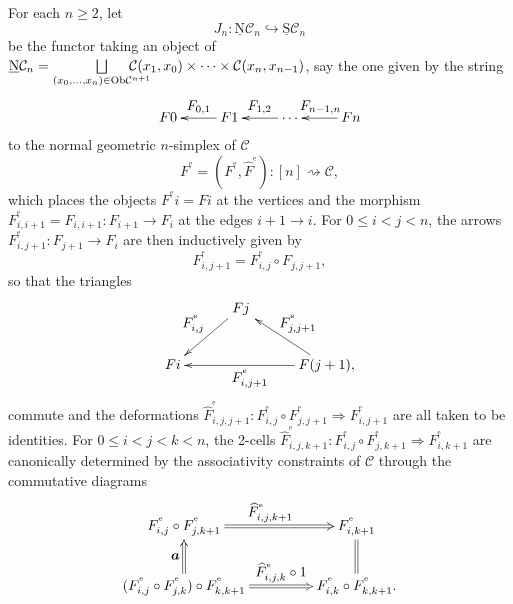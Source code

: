 \documentclass[]{amsart}
\begin{document}
For each $n\geq 2$, let
$$
J_n: {\ensuremath{\underline{\mathrm{N}}}}{\ensuremath{\mathcal{C}}}_n \hookrightarrow \underline{\mathrm{S}}{\ensuremath{\mathcal{C}}}_n
$$
be the functor taking an object of ${\ensuremath{\underline{\mathrm{N}}}}{\ensuremath{\mathcal{C}}}_n= \bigsqcup\limits _{(x_0,\ldots,x_n)\in
\mbox{\scriptsize Ob}{\ensuremath{\mathcal{C}}}^{n+1}}\hspace{-0.6cm} {\ensuremath{\mathcal{C}}}(x_1,x_0)\times\cdots\times{\ensuremath{\mathcal{C}}}(x_n,x_{n-1})$, say
the one given by the string
$$
\xymatrix@C=25pt{F0&\ar[l]_-{\textstyle F_{0,1}}F1&\ar[l]_{\textstyle F_{1,2}}\cdots&\ar[l]_{
\textstyle F_{n-1,n}}Fn}
$$
to the normal geometric $n$-simplex of ${\ensuremath{\mathcal{C}}}$ \begin{equation}\label{fe} F^{^{\mathrm
e}}=(F^{^{\mathrm e}},\widehat{F}^{^{\mathrm e}}):[n]\rightsquigarrow {\ensuremath{\mathcal{C}}} ,\end{equation} which
places the objects $F^{^{\mathrm e}}\!i=Fi$ at the vertices and the morphism $F^{^{\mathrm
e}}_{i,i+1}=F_{i,i+1}:F_{i+1}\rightarrow F_i$ at the edges $i+1\to i$. For $0\leq i<j<n$, the
arrows  $F^{^{\mathrm e}}_{i,j+1}:F_{j+1}\to F_i$ are then inductively given by
$$ F^{^{\mathrm e}}_{i,j+1}=F^{^{\mathrm e}}_{i,j}\circ F_{j,j+1},$$
so that the triangles
$$
\xymatrix@C=25pt@R=25pt{ &\hspace{6pt} Fj \hspace{4pt}\ar[dl]_{\textstyle F^{^{\mathrm e}}_{i,j}}            \\
 Fi  & &  \ar[ll]^{\textstyle F^{^{\mathrm e}}_{i,j+1}}    F(j+1)\ar[ul]_{\textstyle F^{^{\mathrm e}}_{j,j+1}}, }
$$
commute and the deformations $\widehat{F}^{^{\mathrm e}}_{i,j,j+1}:{F}^{^{\mathrm e}}_{i,j}\circ
{F}^{^{\mathrm e}}_{j,j+1}\Rightarrow {F}^{^{\mathrm e}}_{i,j+1}$ are all taken to be identities.
For $0\leq i<j<k< n$, the 2-cells $\widehat{F}^{^{\mathrm e}}_{i,j,k+1}:{F}^{^{\mathrm
e}}_{i,j}\circ {F}^{^{\mathrm e}}_{j,k+1}\Rightarrow {F}^{^{\mathrm e}}_{i,k+1}$ are canonically
determined by the associativity constraints of ${\ensuremath{\mathcal{C}}}$ through the commutative diagrams
$$
\xymatrix@C=45pt{ {F}^{^{\mathrm e}}_{i,j}\circ {F}^{^{\mathrm e}}_{j,k+1} \ar@2{->}[r]^{\textstyle \widehat{F}^{^{\mathrm e}}_{i,j,k+1}} & {F}^{^{\mathrm e}}_{i,k+1}\ar@{=}[d]\\
({F}^{^{\mathrm e}}_{i,j}\circ F^{^{\mathrm e}}_{j,k})\circ F^{^{\mathrm e}}_{k,k+1}
\ar@2{->}[u]^{\textstyle \boldsymbol{a}}\ar@2{->}[r]^-{\textstyle \widehat{F}^{^{\mathrm
e}}_{i,j,k}\circ 1} & {F}^{^{\mathrm e}}_{i,k}\circ F^{^{\mathrm e}}_{k,k+1}. }
$$
\end{document}
